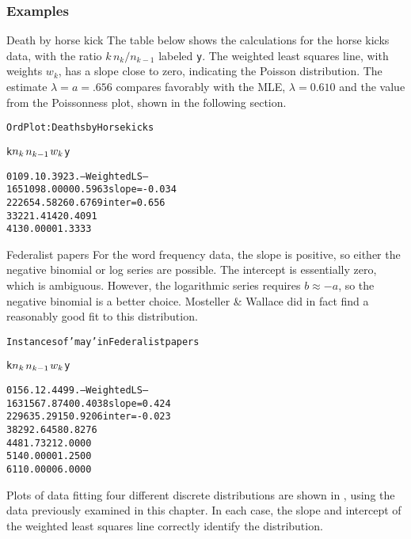 \subsubsection{Examples}
\begin{Example}[horskick3]{Death by horse kick}
The table below shows the calculations for
the horse kicks data, with the ratio \({ k \,  n_k } /  { n_{k-1}
}\) labeled \texttt{y}.  The weighted least squares line, with weights
\(w_k\), has a slope close to zero, indicating the Poisson
distribution.  The estimate \(\lambda = a = .656\) compares
favorably with the MLE, $\lambda=0.610$ and the
value from the Poissonness plot, shown in the
following section.

\begin{alltt}
      Ord Plot: Deaths by Horsekicks

   k     \(n\sb{k}\)    \(n\sb{k-1}\)       \(w\sb{k}\)         y

   0    109      .    10.3923     .        -- Weighted LS --
   1     65    109     8.0000    0.5963    slope = -0.034
   2     22     65     4.5826    0.6769    inter = 0.656
   3      3     22     1.4142    0.4091
   4      1      3     0.0000    1.3333
\end{alltt}
\end{Example}

\begin{Example}[madison3]{Federalist papers}
For the word frequency data, the slope is positive, so either the
negative binomial or log series are possible.  The intercept is
essentially zero, which is ambiguous.  However, the logarithmic
series requires \(b \approx  - a\), so the negative binomial is a
better choice.  Mosteller \& Wallace did in fact find a reasonably
good fit to this distribution.

\begin{alltt}
      Instances of 'may' in Federalist papers

   k     \(n\sb{k}\)    \(n\sb{k-1}\)       \(w\sb{k}\)         y

   0    156      .    12.4499     .       -- Weighted LS --
   1     63    156     7.8740    0.4038   slope = 0.424
   2     29     63     5.2915    0.9206   inter = -0.023
   3      8     29     2.6458    0.8276
   4      4      8     1.7321    2.0000
   5      1      4     0.0000    1.2500
   6      1      1     0.0000    6.0000
\end{alltt}

Plots of data fitting four different discrete distributions are
shown in , using the data previously examined
in this chapter.
In each case, the slope and intercept of the weighted least squares line correctly
identify the distribution.
\end{Example}

